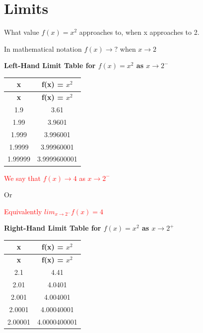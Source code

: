 
\usepackage{setspace}
\usepackage{pgfplots}
\usepackage{cancel}
\usepackage{longtable}


\doublespacing

\tableofcontents
\clearpage
\newpage



\newpage


% 

\newpage
\section{Limits}


\begin{example}
  \label{ex:num_lim}
  What value $f(x) = x^{2}$ approaches to, when x approaches to 2.

  In mathematical notation $f(x) \to ?$ when $x \to 2$
\end{example}

\textbf{Left-Hand Limit Table for \( f(x) = x^2 \) as \( x \to 2^{-} \)}

\begin{longtable}{|c|c|}
\hline
\textbf{x} & \textbf{f(x) = \( x^2 \)} \\
\hline
\endfirsthead
\hline
\textbf{x} & \textbf{f(x) = \( x^2 \)} \\
\hline
\endhead
1.9 & 3.61 \\
\hline
1.99 & 3.9601 \\
\hline
1.999 & 3.996001 \\
\hline
1.9999 & 3.99960001 \\
\hline
1.99999 & 3.9999600001 \\
\hline
\end{longtable}

\textcolor{red}{We say that $f(x) \to 4 $ as $x \to 2^{-}$}

Or

\textcolor{red}{Equivalently $ lim_{x \to 2^{-}}f(x) = 4$}  

\textbf{Right-Hand Limit Table for \( f(x) = x^2 \) as \( x \to 2^{+} \)}

\begin{longtable}{|c|c|}
\hline
\textbf{x} & \textbf{f(x) = \( x^2 \)} \\
\hline
\endfirsthead
\hline
\textbf{x} & \textbf{f(x) = \( x^2 \)} \\
\hline
\endhead
2.1 & 4.41 \\
\hline
2.01 & 4.0401 \\
\hline
2.001 & 4.004001 \\
\hline
2.0001 & 4.00040001 \\
\hline
2.00001 & 4.0000400001 \\
\hline
\end{longtable}

